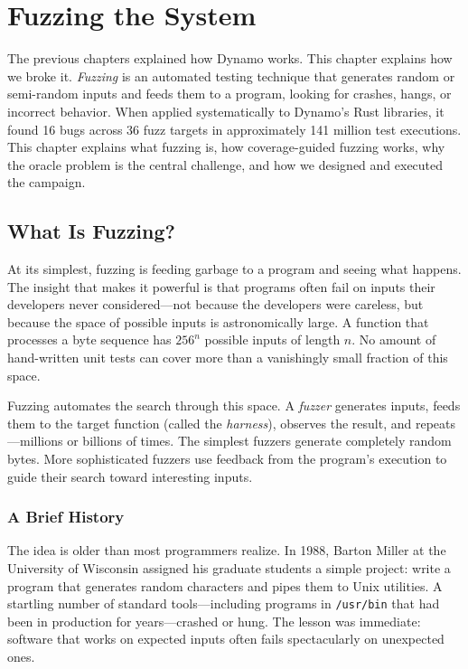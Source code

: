 \chapter{Fuzzing the System}
\label{ch:fuzzing}

The previous chapters explained how Dynamo works. This chapter explains how we broke it. \emph{Fuzzing} is an automated testing technique that generates random or semi-random inputs and feeds them to a program, looking for crashes, hangs, or incorrect behavior. When applied systematically to Dynamo's Rust libraries, it found 16 bugs across 36 fuzz targets in approximately 141 million test executions. This chapter explains what fuzzing is, how coverage-guided fuzzing works, why the oracle problem is the central challenge, and how we designed and executed the campaign.

\section{What Is Fuzzing?}
\label{sec:fuzzing:what}

%
At its simplest, fuzzing is feeding garbage to a program and seeing what happens. The insight that makes it powerful is that programs often fail on inputs their developers never considered---not because the developers were careless, but because the space of possible inputs is astronomically large. A function that processes a byte sequence has $256^n$ possible inputs of length $n$. No amount of hand-written unit tests can cover more than a vanishingly small fraction of this space.

Fuzzing automates the search through this space. A \emph{fuzzer} generates inputs, feeds them to the target function (called the \emph{harness}), observes the result, and repeats---millions or billions of times. The simplest fuzzers generate completely random bytes. More sophisticated fuzzers use feedback from the program's execution to guide their search toward interesting inputs.

\subsection{A Brief History}

The idea is older than most programmers realize. In 1988, Barton Miller at the University of Wisconsin assigned his graduate students a simple project: write a program that generates random characters and pipes them to Unix utilities. A startling number of standard tools---including programs in \texttt{/usr/bin} that had been in production for years---crashed or hung. The lesson was immediate: software that works on expected inputs often fails spectacularly on unexpected ones.

